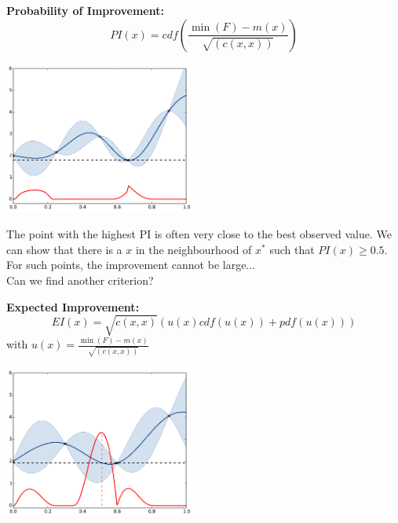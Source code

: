 \documentclass{beamer}
\begin{document}
\begin{frame}{}
\textbf{Probability of Improvement:}
$$PI(x) = cdf \left(\frac{\min(F) - m(x)}{\sqrt{(c(x,x))}} \right)$$
\begin{center}
\includegraphics[height=5cm]{figures/python/ego_PI}
\end{center}
\end{frame}

\begin{frame}{}
The point with the highest PI is often very close to the best observed value. We can show that there is a $x$ in the neighbourhood of $x^*$ such that $PI(x) \geq 0.5$.\\
\vspace{5mm}
For such points, the improvement cannot be large... \\
\vspace{3mm}
Can we find another criterion?
\end{frame}

\begin{frame}{}
\textbf{Expected Improvement:}
$$EI(x) = \sqrt{c(x,x)} (u(x) cdf(u(x)) + pdf(u(x)))$$
\qquad with $ \displaystyle u(x) = \frac{\min(F) - m(x)}{\sqrt{(c(x,x))}}$
\begin{center}
\includegraphics[height=5cm]{figures/python/ego_EI0}
\end{center}
\end{frame}
\end{document}
